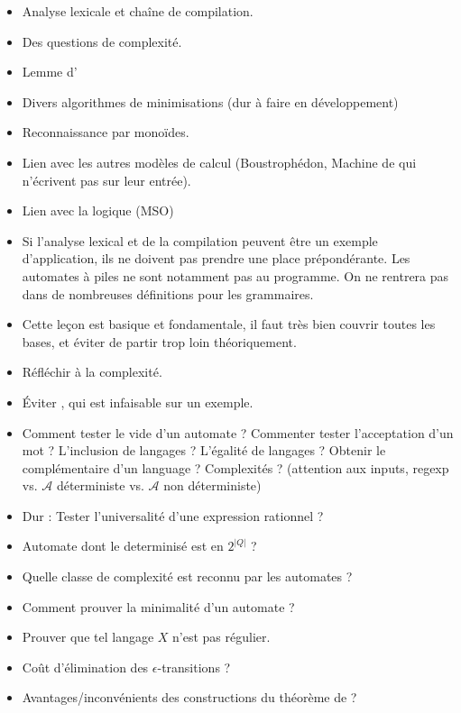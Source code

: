 \documentclass{agregfiche}
\begin{document}
\secidees
\begin{itemize}
	\item Analyse lexicale et chaîne de compilation.
	\item Des questions de complexité.
    \item Lemme d'
	\item Divers algorithmes de minimisations (dur à faire en développement)
	\item Reconnaissance par monoïdes.
	\item Lien avec les autres modèles de calcul (Boustrophédon, Machine de 
	qui n'écrivent pas sur leur entrée).
	\item Lien avec la logique (MSO)
\end{itemize}


\secpieges

\begin{itemize}
\item Si l'analyse lexical et de la compilation peuvent être un exemple d'application, ils ne doivent pas prendre une place prépondérante. Les automates à piles ne sont notamment pas au programme. On ne rentrera pas dans de nombreuses définitions pour les grammaires.
\item Cette leçon est basique et fondamentale, il faut très bien couvrir toutes les bases, et éviter de partir trop loin théoriquement.
\item Réfléchir à la complexité.
\item Éviter  , qui est infaisable sur un exemple.
\end{itemize}




\secquestionsclassiques
\begin{itemize}
\item Comment tester le vide d'un automate ? Commenter tester l'acceptation d'un mot ? L'inclusion de langages ? L'égalité de langages ? Obtenir le complémentaire d'un language ? Complexités ? (attention aux inputs, regexp vs. $\mathcal{A}$ déterministe vs. $\mathcal{A}$ non déterministe)
\item Dur : Tester l'universalité d'une expression rationnel ?
\item Automate dont le determinisé est en $2^{|Q|}$ ?
\item Quelle classe de complexité est reconnu par les automates ?
\item Comment prouver la minimalité d'un automate ?
\item Prouver que tel langage $X$ n'est pas régulier.
\item Coût d'élimination des $\epsilon$-transitions ?
\item Avantages/inconvénients des constructions du théorème de   ?
\end{itemize}
\end{document}
